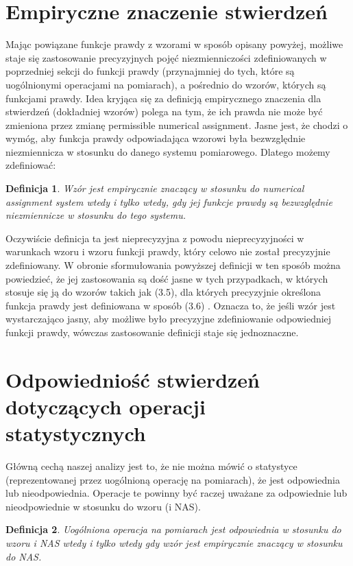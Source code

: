 \documentclass[12pt,a4paper]{report}
\newtheorem{definition}{Definicja}[chapter]
\begin{document}
\section{Empiryczne znaczenie stwierdzeń}

Mając powiązane funkcje prawdy z wzorami w sposób opisany powyżej, możliwe staje się zastosowanie precyzyjnych pojęć niezmienniczości zdefiniowanych w poprzedniej sekcji do funkcji prawdy (przynajmniej do tych, które są uogólnionymi operacjami na pomiarach), a pośrednio do wzorów, których są funkcjami prawdy. Idea kryjąca się za definicją empirycznego znaczenia dla stwierdzeń (dokładniej wzorów) polega na tym, że ich prawda nie może być zmieniona przez zmianę permissible numerical assignment. Jasne jest, że chodzi o wymóg, aby funkcja prawdy odpowiadająca wzorowi była bezwzględnie niezmiennicza w stosunku do danego systemu pomiarowego. Dlatego możemy zdefiniować:
\begin{definition}
Wzór jest empirycznie znaczący w stosunku do numerical assignment system wtedy i tylko wtedy, gdy jej funkcje prawdy są bezwzględnie niezmiennicze w stosunku do  tego systemu.
\end{definition}
Oczywiście definicja ta jest nieprecyzyjna z powodu nieprecyzyjności w warunkach wzoru i wzoru funkcji prawdy, który celowo nie został precyzyjnie zdefiniowany. W obronie sformułowania powyższej definicji w ten sposób można powiedzieć, że jej zastosowania są dość jasne w tych przypadkach, w których stosuje się ją do wzorów takich jak (3.5), dla których precyzyjnie określona funkcja prawdy jest definiowana w sposób (3.6) . Oznacza to, że jeśli wzór jest wystarczająco jasny, aby możliwe było precyzyjne zdefiniowanie odpowiedniej funkcji prawdy, wówczas zastosowanie definicji staje się jednoznaczne.
\section{Odpowiedniość stwierdzeń dotyczących operacji statystycznych}

Główną cechą naszej analizy jest to, że nie można mówić o statystyce (reprezentowanej przez uogólnioną operację na pomiarach), że jest odpowiednia lub nieodpowiednia. Operacje te powinny być raczej uważane za odpowiednie lub nieodpowiednie w stosunku do wzoru (i NAS).
\begin{definition}
Uogólniona operacja na pomiarach jest odpowiednia w stosunku do wzoru i NAS wtedy i tylko wtedy gdy wzór jest empirycznie znaczący w stosunku do NAS.
\end{definition}
\end{document}
